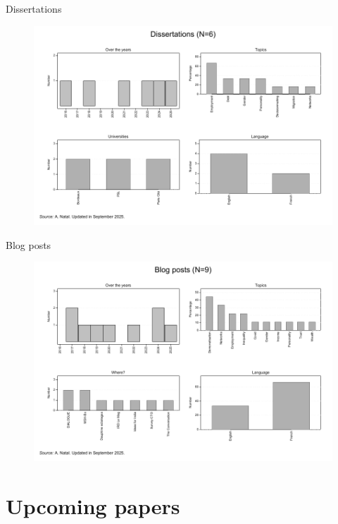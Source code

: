 \documentclass[aspectratio=169]{beamer}
\begin{document}
\begin{frame}{Dissertations}

\begin{figure}[h]
\centering
\includegraphics[width=0.7\columnwidth]{INPUT/D_global}
\end{figure}

\end{frame}





\begin{frame}{Blog posts}

\begin{figure}[h]
\centering
\includegraphics[width=0.7\columnwidth]{INPUT/BP_global}
\end{figure}

\end{frame}





\section*{Upcoming papers}
\begin{frame}
\label{upcoming}


\end{frame}
\end{document}
